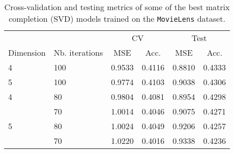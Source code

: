 \begin{table}[H]
\centering
\begin{tabular}{llcccc}
\toprule
  &     &   \multicolumn{2}{c}{CV} & \multicolumn{2}{c}{Test}\\
  \cmidrule(lr){3-4}\cmidrule(lr){5-6}
Dimension & Nb. iterations &        MSE & Acc. & MSE & Acc.  \\
\midrule
4 & 100 &  0.9533 &      0.4116 &   0.8810 &        0.4333 \\
5 & 100 &  0.9774 &      0.4103 &   0.9038 &        0.4306 \\
4 & 80  &  0.9804 &      0.4081 &   0.8954 &        0.4298 \\
  & 70  &  1.0014 &      0.4046 &   0.9075 &        0.4271 \\
5 & 80  &  1.0024 &      0.4049 &   0.9206 &        0.4257 \\
  & 70  &  1.0220 &      0.4016 &   0.9338 &        0.4236 \\
\bottomrule
\end{tabular}
\caption{Cross-validation and testing metrics of some of the best matrix completion (SVD) models trained on the \texttt{MovieLens} dataset. }
\label{tab:results.svd}
\end{table}
